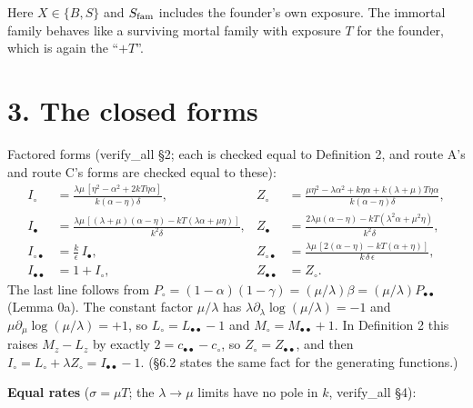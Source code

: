 \documentclass[10pt,]{article}
\begin{document}
Here \(X\in\{B,S\}\) and \(S_{\rm fam}\) includes the founder's own
exposure. The immortal family behaves like a surviving mortal family
with exposure \(T\) for the founder, which is again the ``\(+T\)''.

\hypertarget{the-closed-forms}{%
\section{3. The closed forms}\label{the-closed-forms}}

Factored forms (verify\_all §2; each is checked equal to Definition 2,
and route A's and route C's forms are checked equal to these): \[
\begin{aligned}
I_\circ&=\frac{\lambda\mu\,[\eta^2-\alpha^2+2kT\eta\alpha]}{k(\alpha-\eta)\delta}, &
Z_\circ&=\frac{\mu\eta^2-\lambda\alpha^2+k\eta\alpha+k(\lambda+\mu)T\eta\alpha}{k(\alpha-\eta)\delta},\\
I_\bullet&=\frac{\lambda\mu\,[(\lambda+\mu)(\alpha-\eta)-kT(\lambda\alpha+\mu\eta)]}{k^2\delta}, &
Z_\bullet&=\frac{2\lambda\mu(\alpha-\eta)-kT(\lambda^2\alpha+\mu^2\eta)}{k^2\delta},\\
I_{\circ\bullet}&=\frac{k}{\epsilon}\,I_\bullet, &
Z_{\circ\bullet}&=\frac{\lambda\mu\,[2(\alpha-\eta)-kT(\alpha+\eta)]}{k\,\delta\,\epsilon},\\
I_{\bullet\bullet}&=1+I_\circ, & Z_{\bullet\bullet}&=Z_\circ .
\end{aligned}
\] The last line follows from
\(P_\circ=(1-\alpha)(1-\gamma)=(\mu/\lambda)\beta=(\mu/\lambda)P_{\bullet\bullet}\)
(Lemma 0a). The constant factor \(\mu/\lambda\) has
\(\lambda\partial_\lambda\log(\mu/\lambda)=-1\) and
\(\mu\partial_\mu\log(\mu/\lambda)=+1\), so
\(L_\circ=L_{\bullet\bullet}-1\) and \(M_\circ=M_{\bullet\bullet}+1\).
In Definition 2 this raises \(M_z-L_z\) by exactly
\(2=c_{\bullet\bullet}-c_\circ\), so \(Z_\circ=Z_{\bullet\bullet}\), and
then \(I_\circ=L_\circ+\lambda Z_\circ=I_{\bullet\bullet}-1\). (§6.2
states the same fact for the generating functions.)

\textbf{Equal rates} (\(\sigma=\mu T\); the \(\lambda\to\mu\) limits
have no pole in \(k\), verify\_all §4):
\end{document}
